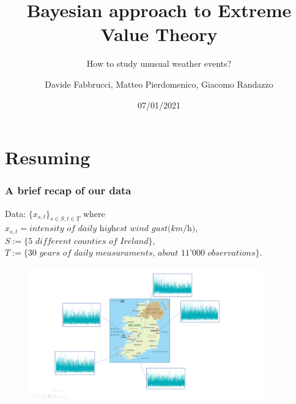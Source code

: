 \documentclass[usenames,dvipsnames]{beamer}
\title{Bayesian approach to Extreme Value Theory}
\subtitle{How to study unusual weather events?}
\author{Davide Fabbrucci, Matteo Pierdomenico, Giacomo Randazzo}
\institute{Politecnico di Milano}
\date{07/01/2021}
\begin{document}
\begin{frame}
\titlepage
\end{frame}
\section{Resuming}

\begin{frame}
\frametitle{A brief recap of our data}
\small

\vspace{10pt}
Data: $\{x_{s,t}\}_{s \in S,t \in T} $ where \\
$x_{s,t} =\textit{intensity of daily highest wind gust(km/h)} $, \\
$S:=\{\textit{5 different counties of Ireland}\}$,\\
$T:=\{\textit{30 years of daily measuraments, about 11'000 observations}\}$. 
\begin{figure}[h!]
 \centering
  \includegraphics[width=0.9\textwidth]{ireland.png}
 \end{figure}

\end{frame}
\end{document}
